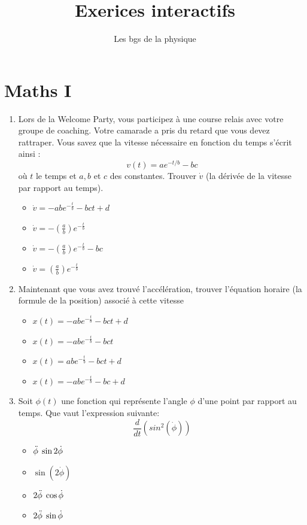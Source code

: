 \documentclass{article}
\title{Exerices interactifs}
\author{Les bgs de la physique}
\begin{document}
\maketitle

\section{Maths I}
\begin{enumerate}
    \item Lors de la Welcome Party, vous participez à une course relais avec votre groupe de coaching. Votre camarade a pris du retard que vous devez rattraper. Vous savez que la vitesse nécessaire en fonction du temps s’écrit ainsi : \[v(t) = a e^{-t/b}-bc \]
où $t$ le temps et $a,b$ et $c$ des constantes. Trouver $\Dot{v}$ (la dérivée de la vitesse par rapport au temps).

    \begin{itemize}
        \item $\Dot{v} = -ab e^{-\frac{t}{b}}-bct +d$
        \item $\Dot{v} =- (\frac{a}{b})e^{-\frac{t}{b}}$ %
        \item $\Dot{v} =- (\frac{a}{b})e^{-\frac{t}{b}}-bc$
        \item $\Dot{v} = (\frac{a}{b})e^{-\frac{t}{b}}$ 
    \end{itemize}
    
    \item Maintenant que vous avez trouvé l'accélération, trouver l'équation horaire (la formule de la position) associé à cette vitesse
    
    \begin{itemize}
        \item  $x(t) = -abe^{-\frac{t}{b}}-bct +d$
        \item $x(t) = -abe^{-\frac{t}{b}}-bct $
        \item $x(t) = abe^{-\frac{t}{b}}-bct +d$
        \item $x(t) = -abe^{-\frac{t}{b}}-bc +d$

    \end{itemize}

    \item Soit $\phi(t)$ une fonction qui représente l'angle $\phi$ d'une point par rapport au temps. Que vaut l'expression suivante:
    \[ \frac{d}{dt}(sin^2(\Dot{\phi}))\] %
    \begin{itemize}
        \item $\Ddot{\phi} \; \sin{2 \Dot{\phi}}$ %
        \item $\sin{(2 \Dot{\phi})}$ %
        \item $ 2\Ddot{\phi} \; \cos{\Dot{\phi}} $ %
        \item $2 \Ddot{\phi} \; \sin{\Dot{\phi}}$
    \end{itemize}
    

\end{enumerate}
\end{document}
